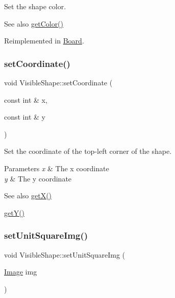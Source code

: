 Set the shape color. 

\begin{DoxySeeAlso}{See also}
\mbox{\hyperlink{class_visible_shape_a80fe773d65776d9402be26068564882d}{get\+Color()}} 
\end{DoxySeeAlso}


Reimplemented in \mbox{\hyperlink{class_board_afa3fa04776e43db38f3f1dd9bba28e6e}{Board}}.

\mbox{\label{class_visible_shape_a350f7faac22e405df7c4012fe9d03fac}} 
\subsubsection{\texorpdfstring{set\+Coordinate()}{setCoordinate()}}
{\footnotesize\ttfamily void Visible\+Shape\+::set\+Coordinate (\begin{DoxyParamCaption}\item[{const int \&}]{x,  }\item[{const int \&}]{y }\end{DoxyParamCaption})\hspace{0.3cm}{\ttfamily [virtual]}}



Set the coordinate of the top-\/left corner of the shape. 


\begin{DoxyParams}{Parameters}
{\em x} & The x coordinate \\
\hline
{\em y} & The y coordinate \\
\hline
\end{DoxyParams}
\begin{DoxySeeAlso}{See also}
\mbox{\hyperlink{class_visible_shape_a623ee2bd2e408da908ec5b210347b36e}{get\+X()}} 

\mbox{\hyperlink{class_visible_shape_ace747d31bf685044d815b6fa1944055e}{get\+Y()}} 
\end{DoxySeeAlso}
\mbox{\label{class_visible_shape_ae0b09cac51ba9af744cddce67fe0180a}} 
\subsubsection{\texorpdfstring{set\+Unit\+Square\+Img()}{setUnitSquareImg()}}
{\footnotesize\ttfamily void Visible\+Shape\+::set\+Unit\+Square\+Img (\begin{DoxyParamCaption}\item[{\mbox{\hyperlink{class_image}{Image}}}]{img }\end{DoxyParamCaption})\hspace{0.3cm}{\ttfamily [virtual]}}

